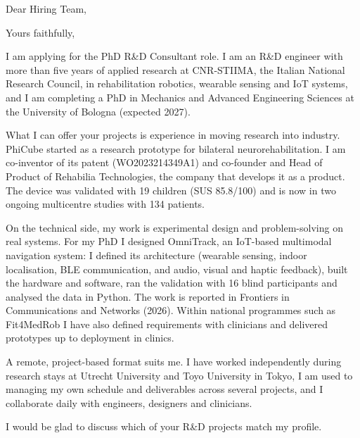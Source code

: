 \documentclass[11pt,a4paper,sans]{moderncv}
\begin{document}

\opening{Dear Hiring Team,}
\closing{Yours faithfully,}
\makelettertitle

I am applying for the PhD R\&D Consultant role. I am an R\&D engineer with more than five years of applied research at CNR-STIIMA, the Italian National Research Council, in rehabilitation robotics, wearable sensing and IoT systems, and I am completing a PhD in Mechanics and Advanced Engineering Sciences at the University of Bologna (expected 2027).

What I can offer your projects is experience in moving research into industry. PhiCube started as a research prototype for bilateral neurorehabilitation. I am co-inventor of its patent (WO2023214349A1) and co-founder and Head of Product of Rehabilia Technologies, the company that develops it as a product. The device was validated with 19 children (SUS 85.8/100) and is now in two ongoing multicentre studies with 134 patients.

On the technical side, my work is experimental design and problem-solving on real systems. For my PhD I designed OmniTrack, an IoT-based multimodal navigation system: I defined its architecture (wearable sensing, indoor localisation, BLE communication, and audio, visual and haptic feedback), built the hardware and software, ran the validation with 16 blind participants and analysed the data in Python. The work is reported in Frontiers in Communications and Networks (2026). Within national programmes such as Fit4MedRob I have also defined requirements with clinicians and delivered prototypes up to deployment in clinics.

A remote, project-based format suits me. I have worked independently during research stays at Utrecht University and Toyo University in Tokyo, I am used to managing my own schedule and deliverables across several projects, and I collaborate daily with engineers, designers and clinicians.

I would be glad to discuss which of your R\&D projects match my profile.

\makeletterclosing
\end{document}
